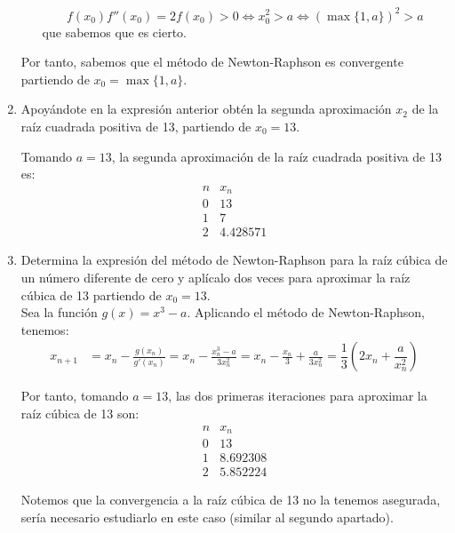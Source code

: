 \begin{ejercicio}
\begin{enumerate}
\begin{enumerate}
            \begin{equation*}
                f(x_0)f''(x_0) = 2f(x_0)>0\iff
                x_0^2>a \iff (\max\{1,a\})^2>a
            \end{equation*}
            que sabemos que es cierto.
        \end{enumerate}

        Por tanto, sabemos que el método de Newton-Raphson es convergente partiendo de $x_0 = \max\{1, a\}$.
        \item Apoyándote en la expresión anterior obtén la segunda aproximación $x_2$ de la raíz cuadrada positiva de 13, partiendo de $x_0 = 13$.
        
        Tomando $a=13$, la segunda aproximación de la raíz cuadrada positiva de 13 es:
        \begin{equation*}
            \begin{array}{c|c}
                n & x_n\\ \hline
                0 & 13 \\
                1 & 7\\
                2 & 4.428571
            \end{array}
        \end{equation*}
        

        \item Determina la expresión del método de Newton-Raphson para la raíz cúbica de un número diferente de cero y aplícalo dos veces para aproximar la raíz cúbica de 13 partiendo de $x_0 = 13$.\\
        
        Sea la función $g(x) = x^3 - a$. Aplicando el método de Newton-Raphson, tenemos:
        \begin{align*}
            x_{n+1} &= x_n - \frac{g(x_n)}{g'(x_n)} = x_n - \frac{x_n^3 - a}{3x_n^2} = x_n - \frac{x_n}{3} + \frac{a}{3x_n^2} = \dfrac{1}{3}\left(2x_n + \dfrac{a}{x_n^2}\right)
        \end{align*}

        Por tanto, tomando $a=13$, las dos primeras iteraciones para aproximar la raíz cúbica de 13 son:
        \begin{equation*}
            \begin{array}{c|c}
                n & x_n\\ \hline
                0 & 13 \\
                1 & 8.692308\\
                2 & 5.852224
            \end{array}
        \end{equation*}

        Notemos que la convergencia a la raíz cúbica de 13 no la tenemos asegurada, sería necesario estudiarlo en este caso (similar al segundo apartado).
    \end{enumerate}
\end{ejercicio}

